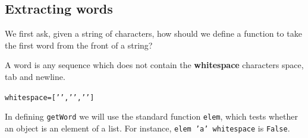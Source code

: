 \subsection*{Extracting words}

We first ask, given a string of characters, how should we define a
function to take the first word from the front of a string? 

A word is any sequence which does not contain
the \textbf{whitespace} characters space, tab and newline. 
\begin{alltt}
whitespace = ['','',' ']
\end{alltt}
In defining \texttt{getWord} we will use the standard function \texttt{elem},
which tests whether an object is an element of a list. For instance,  
\texttt{elem 'a' whitespace} is \texttt{False}.

